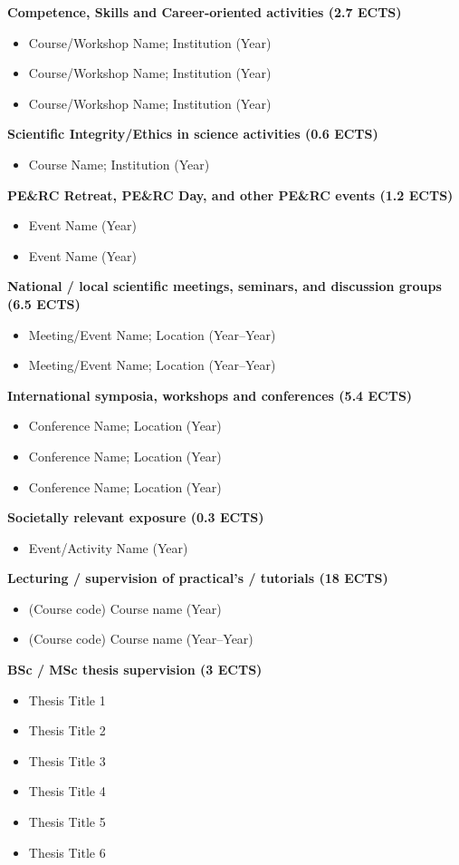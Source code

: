 \textbf{Competence, Skills and Career-oriented activities (2.7 ECTS)}
\begin{itemize}[nolistsep]
    \item Course/Workshop Name; Institution (Year)
    \item Course/Workshop Name; Institution (Year)
    \item Course/Workshop Name; Institution (Year)
\end{itemize}

\textbf{Scientific Integrity/Ethics in science activities (0.6 ECTS)}
\begin{itemize}[nolistsep]
    \item Course Name; Institution (Year)
\end{itemize}

\textbf{PE\&RC Retreat, PE\&RC Day, and other PE\&RC events (1.2 ECTS)}
\begin{itemize}[nolistsep]
    \item Event Name (Year)
    \item Event Name (Year)
\end{itemize}

\textbf{National / local scientific meetings, seminars, and discussion groups (6.5 ECTS)}
\begin{itemize}[nolistsep]
    \item Meeting/Event Name; Location (Year--Year)
    \item Meeting/Event Name; Location (Year--Year)
\end{itemize}

\textbf{International symposia, workshops and conferences (5.4 ECTS)}
\begin{itemize}[nolistsep]
    \item Conference Name; Location (Year)
    \item Conference Name; Location (Year)
    \item Conference Name; Location (Year)
\end{itemize}

\textbf{Societally relevant exposure (0.3 ECTS)}
\begin{itemize}[nolistsep]
    \item Event/Activity Name (Year)
\end{itemize}

\textbf{Lecturing / supervision of practical’s / tutorials (18 ECTS)}
\begin{itemize}[nolistsep]
    \item (Course code) Course name (Year)
    \item (Course code) Course name (Year--Year) %
\end{itemize}

\textbf{BSc / MSc thesis supervision (3 ECTS)}
\begin{itemize}[nolistsep]
    \item Thesis Title 1
    \item Thesis Title 2
    \item Thesis Title 3
    \item Thesis Title 4
    \item Thesis Title 5
    \item Thesis Title 6
\end{itemize}
